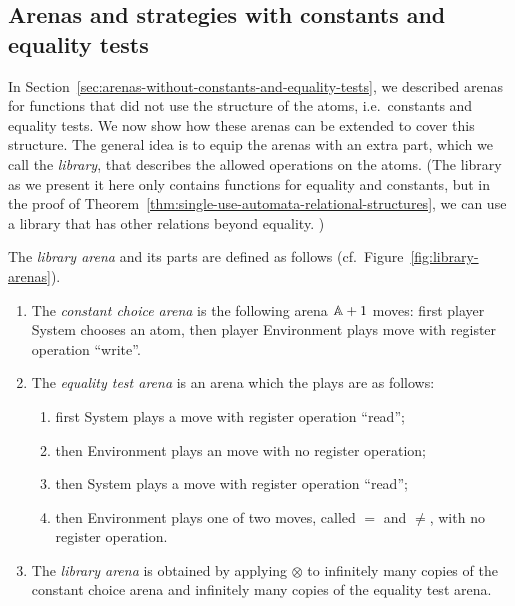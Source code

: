 \documentclass[a4paper,UKenglish,cleveref, autoref, numberwithinsect, thm-restate]{lipics-v2021}
\begin{document}
\subsection{Arenas and strategies with constants and equality tests}
\label{sec:arenas-with-constants-and-equality-tests}
In Section~\ref{sec:arenas-without-constants-and-equality-tests}, we described arenas for functions that did not use the structure of the atoms, i.e.~constants and equality tests. We now show how these arenas can be extended to cover this structure. The general idea is to equip the arenas with an extra part, which we call the \emph{library},  that describes the allowed operations on the atoms. (The library as we present it here only contains functions for equality and constants, but in the proof of Theorem~\ref{thm:single-use-automata-relational-structures}, we can use a library that has other relations beyond equality. )



\begin{definition}\label{def:library-arena} The \emph{library arena} and its parts are defined as follows (cf.~Figure~\ref{fig:library-arenas}).
    \begin{enumerate}
        \item The \emph{constant choice arena} is the following arena $\mathbb A+1$ moves:
        first player System chooses an atom, then player Environment plays move with register operation ``write''. 
        \item The \emph{equality test arena} is an arena which the plays are as follows:
    \begin{enumerate}
        \item first System plays a move with register operation ``read'';
        \item then Environment plays an move with no register operation;
        \item then System plays a move with register operation ``read'';
        \item then Environment plays one of two moves, called $=$ and $\neq$, with no register operation.
    \end{enumerate}
    \item The \emph{library arena} is obtained by applying $\otimes$ to infinitely many copies of the constant choice arena and infinitely many copies of the  equality test arena.
    \end{enumerate}
\end{definition}
\end{document}
